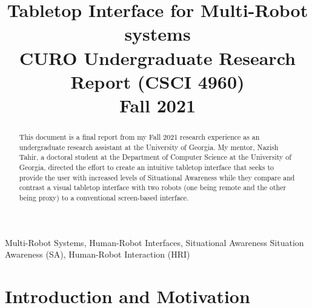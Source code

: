 \documentclass[conference]{IEEEtran}
\begin{document}
\title{Tabletop Interface for Multi-Robot systems \\ CURO Undergraduate Research Report (CSCI 4960) \\ Fall 2021
}
\author{
}

\maketitle


\begin{abstract}
This document is a final report from my Fall 2021 research experience as an undergraduate research assistant at the University of Georgia. My mentor, Nazish Tahir, a doctoral student at the Department of Computer Science at the University of Georgia, directed the effort to create an intuitive tabletop interface that seeks to provide the user with increased levels of Situational Awareness while they compare and contrast a visual tabletop interface with two robots (one being remote and the other being proxy) to a conventional screen-based interface. 

\end{abstract}
\begin{IEEEkeywords}
Multi-Robot Systems, Human-Robot Interfaces, Situational Awareness Situation Awareness (SA), Human-Robot Interaction (HRI)
\end{IEEEkeywords}


\section{Introduction and Motivation}
\end{document}
